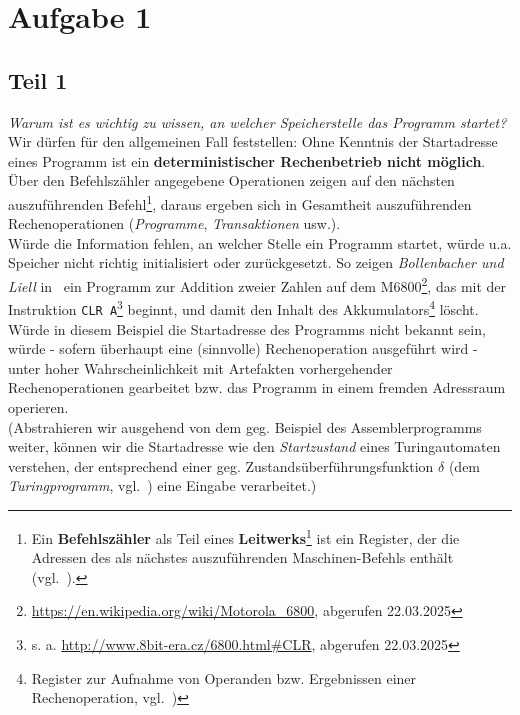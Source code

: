 \chapter{Aufgabe 1}

\section{Teil 1}

\textit{Warum ist es wichtig zu wissen, an welcher Speicherstelle das Programm startet?}\\

\noindent
Wir dürfen für den allgemeinen Fall feststellen: Ohne Kenntnis der Startadresse eines Programm ist ein \textbf{deterministischer Rechenbetrieb nicht möglich}.\\

\noindent
Über den Befehlszähler angegebene Operationen zeigen auf den nächsten auszuführenden Befehl\footnote{
    Ein \textbf{Befehlszähler} als Teil eines \textbf{Leitwerks}\footnote{
        hier insb. bei der Von-Neumann-Rechnerarchitektur
    } ist ein Register, der die Adressen des als nächstes auszuführenden Maschinen-Befehls enthält (vgl.~\cite[234]{Fri21}).
}, daraus ergeben sich in Gesamtheit auszuführenden Rechenoperationen (\textit{Programme}, \textit{Transaktionen} usw.).\\
Würde die Information fehlen, an welcher Stelle ein Programm startet,  würde u.a. Speicher nicht richtig initialisiert oder zurückgesetzt.
So zeigen \textit{Bollenbacher und Liell} in~\cite[\textbf{Tabelle 19}, 86]{BL22} ein Programm zur Addition zweier Zahlen auf dem M6800\footnote{
\url{https://en.wikipedia.org/wiki/Motorola_6800}, abgerufen 22.03.2025
}, das mit der Instruktion \texttt{CLR A}\footnote{
s. a. \url{http://www.8bit-era.cz/6800.html#CLR}, abgerufen 22.03.2025
} beginnt, und damit den Inhalt des  Akkumulators\footnote{
Register zur Aufnahme von Operanden bzw. Ergebnissen einer Rechenoperation, vgl.~\cite[233]{Fri21})
} löscht.
Würde in diesem Beispiel die Startadresse des Programms nicht bekannt sein, würde - sofern überhaupt eine (sinnvolle) Rechenoperation ausgeführt wird - unter hoher Wahrscheinlichkeit mit Artefakten vorhergehender Rechenoperationen gearbeitet bzw. das Programm in einem fremden Adressraum operieren.\\

\noindent
(Abstrahieren wir ausgehend von dem geg. Beispiel des Assemblerprogramms weiter, können wir die Startadresse wie den \textit{Startzustand} eines Turingautomaten verstehen, der entsprechend einer geg. Zustandsüberführungsfunktion $\delta$ (dem \textit{Turingprogramm}, vgl.~\cite[269 f.]{VW16h}) eine Eingabe verarbeitet.)

